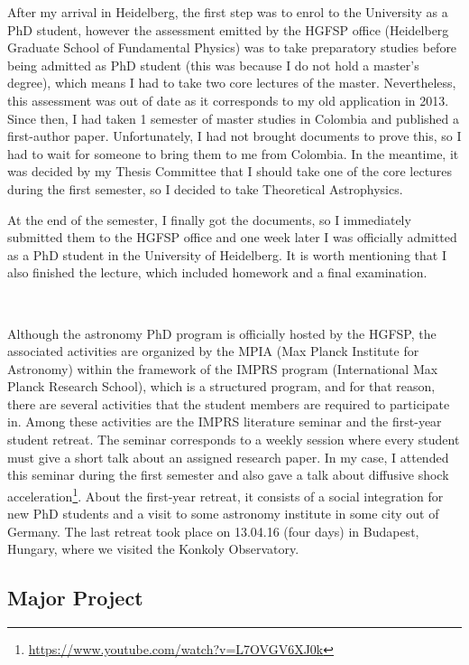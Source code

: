 \documentclass[a4,useAMS,usenatbib,usegraphicx,12pt]{article}
\begin{document}
After my arrival in Heidelberg, the first step was to enrol to the University as
a PhD student, however the assessment emitted by the HGFSP office (Heidelberg 
Graduate School of Fundamental Physics) was to take preparatory studies before 
being admitted as PhD student (this was because I do not hold a master's degree), 
which means I had to take two core lectures of the master. Nevertheless, this 
assessment was out of date as it corresponds to my old application in 2013. Since 
then, I had taken 1 semester of master studies in Colombia and published a 
first-author paper. Unfortunately, I had not brought documents to prove this, so
I had to wait for someone to bring them to me from Colombia. In the meantime,
it was decided by my Thesis Committee that I should take one of the core lectures 
during the first semester, so I decided to take Theoretical Astrophysics.

At the end of the semester, I finally got the documents, so I immediately 
submitted them to the HGFSP office and one week later I was officially admitted 
as a PhD student in the University of Heidelberg. It is worth mentioning that I 
also finished the lecture, which included homework and a final examination.

\

Although the astronomy PhD program is officially hosted by the HGFSP, the 
associated activities are organized by the MPIA (Max Planck Institute for 
Astronomy) within the framework of the IMPRS program (International Max Planck
Research School), which is a structured program, and for that reason, there are 
several activities that the student members are required to participate in. 
Among these activities are the IMPRS literature seminar and the first-year 
student retreat. The seminar corresponds to a weekly session where every student 
must give a short talk about an assigned research paper. In my case, I attended 
this seminar during the first semester and also gave a talk about diffusive 
shock acceleration\footnote{\url{https://www.youtube.com/watch?v=L7OVGV6XJ0k}}.
About the first-year retreat, it consists of a social integration for new PhD
students and a visit to some astronomy institute in some city out of Germany.
The last retreat took place on 13.04.16 (four days) in Budapest, Hungary, where
we visited the Konkoly Observatory.


\subsection{Major Project}
\end{document}
